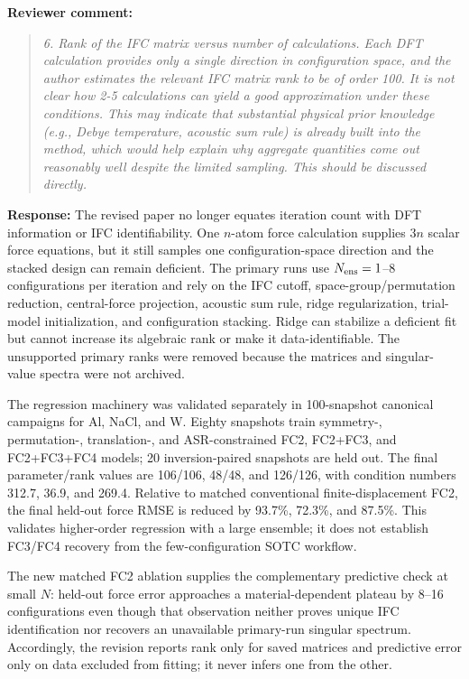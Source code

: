 \documentclass[11pt]{article}
\newcommand{\Question}[1]{\par\medskip\noindent\textbf{Reviewer comment:}\par\begin{quote}\itshape #1\end{quote}}
\newcommand{\Answer}[1]{\par\noindent\color{black}\normalfont\textbf{Response:} #1\par\smallskip}
\begin{document}
\Question{6. Rank of the IFC matrix versus number of calculations. Each DFT calculation provides only a single direction in configuration space, and the author estimates the relevant IFC matrix rank to be of order 100. It is not clear how 2-5 calculations can yield a good approximation under these conditions. This may indicate that substantial physical prior knowledge (e.g., Debye temperature, acoustic sum rule) is already built into the method, which would help explain why aggregate quantities come out reasonably well despite the limited sampling. This should be discussed directly.}

\Answer{The revised paper no longer equates iteration count with DFT information or IFC identifiability. One $n$-atom force calculation supplies $3n$ scalar force equations, but it still samples one configuration-space direction and the stacked design can remain deficient. The primary runs use $N_{\rm ens}=1$--8 configurations per iteration and rely on the IFC cutoff, space-group/permutation reduction, central-force projection, acoustic sum rule, ridge regularization, trial-model initialization, and configuration stacking. Ridge can stabilize a deficient fit but cannot increase its algebraic rank or make it data-identifiable. The unsupported primary ranks were removed because the matrices and singular-value spectra were not archived.

The regression machinery was validated separately in 100-snapshot canonical campaigns for Al, NaCl, and W. Eighty snapshots train symmetry-, permutation-, translation-, and ASR-constrained FC2, FC2+FC3, and FC2+FC3+FC4 models; 20 inversion-paired snapshots are held out. The final parameter/rank values are 106/106, 48/48, and 126/126, with condition numbers 312.7, 36.9, and 269.4. Relative to matched conventional finite-displacement FC2, the final held-out force RMSE is reduced by 93.7\%, 72.3\%, and 87.5\%. This validates higher-order regression with a large ensemble; it does not establish FC3/FC4 recovery from the few-configuration SOTC workflow.

The new matched FC2 ablation supplies the complementary predictive check at
small $N$: held-out force error approaches a material-dependent plateau by
8--16 configurations even though that observation neither proves unique IFC
identification nor recovers an unavailable primary-run singular spectrum.
Accordingly, the revision reports rank only for saved matrices and predictive
error only on data excluded from fitting; it never infers one from the other.}
\end{document}
